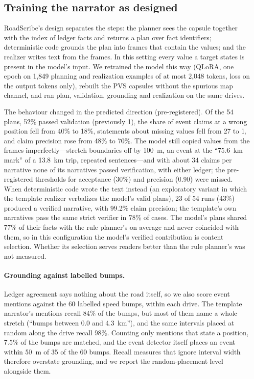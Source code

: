 \subsection{Training the narrator as designed}
\label{sec:pgr}
RoadScribe's design separates the steps: the planner sees the capsule together with the index of ledger facts and returns a plan over fact identifiers; deterministic code grounds the plan into frames that contain the values; and the realizer writes text from the frames.
In this setting every value a target states is present in the model's input.
We retrained the model this way (QLoRA, one epoch on 1{,}849 planning and realization examples of at most 2{,}048 tokens, loss on the output tokens only), rebuilt the PVS capsules without the spurious map channel, and ran plan, validation, grounding and realization on the same drives.

The behaviour changed in the predicted direction (pre-registered).
Of the 54 plans, 52\% passed validation (previously 1), the share of event claims at a wrong position fell from 40\% to 18\%, statements about missing values fell from 27 to 1, and claim precision rose from 48\% to 70\%.
The model still copied values from the frames imperfectly---stretch boundaries off by 100~m, an event at the ``75.6~km mark'' of a 13.8~km trip, repeated sentences---and with about 34 claims per narrative none of its narratives passed verification, with either ledger; the pre-registered thresholds for acceptance (30\%) and precision (0.90) were missed.
When deterministic code wrote the text instead (an exploratory variant in which the template realizer verbalizes the model's valid plans), 23 of 54 runs (43\%) produced a verified narrative, with 99.2\% claim precision; the template's own narratives pass the same strict verifier in 78\% of cases.
The model's plans shared 77\% of their facts with the rule planner's on average and never coincided with them, so in this configuration the model's verified contribution is content selection.
Whether its selection serves readers better than the rule planner's was not measured.

\paragraph{Grounding against labelled bumps.}
Ledger agreement says nothing about the road itself, so we also score event mentions against the 60 labelled speed bumps, within each drive.
The template narrator's mentions recall 84\% of the bumps, but most of them name a whole stretch (``bumps between 0.0 and 4.3~km''), and the same intervals placed at random along the drive recall 98\%.
Counting only mentions that state a position, 7.5\% of the bumps are matched, and the event detector itself places an event within 50~m of 35 of the 60 bumps.
Recall measures that ignore interval width therefore overstate grounding, and we report the random-placement level alongside them.

